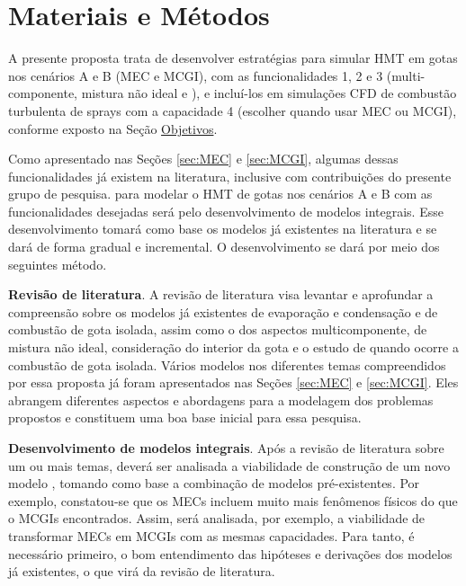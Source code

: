 

\section{Materiais e Métodos} \label{sec:metod}

A presente proposta trata de desenvolver estratégias para simular HMT em gotas nos cenários {A} e {B} (MEC e MCGI), com as funcionalidades {1}, {2} e {3} (multi-componente, mistura não ideal e ), e incluí-los em simulações CFD de combustão turbulenta de sprays com a capacidade 4 (escolher quando usar MEC ou MCGI), conforme exposto na Seção \hyperref[sec:objetivos]{Objetivos}.

Como apresentado nas Seções \ref{sec:MEC} e \ref{sec:MCGI}, algumas dessas funcionalidades já existem na literatura, inclusive com contribuições do presente grupo de pesquisa.
 para modelar o HMT de gotas nos cenários {A} e {B} com as funcionalidades desejadas será pelo desenvolvimento de modelos integrais.
Esse desenvolvimento tomará como base os modelos já existentes na literatura e se dará de forma gradual e incremental.
O desenvolvimento se dará por meio dos seguintes método.

\textbf{Revisão de literatura}. 
A revisão de literatura visa levantar e aprofundar a compreensão sobre os modelos já  existentes de evaporação e condensação e de combustão de gota isolada, assim como o dos aspectos multicomponente, de mistura não ideal, consideração do interior da gota e o estudo de quando ocorre a combustão de gota isolada.
Vários modelos nos diferentes temas compreendidos por essa proposta já foram apresentados nas Seções \ref{sec:MEC} e \ref{sec:MCGI}.
Eles abrangem diferentes aspectos e abordagens para a modelagem dos problemas propostos e constituem uma boa base inicial para essa pesquisa. 

\textbf{Desenvolvimento de modelos integrais}.
Após a revisão de literatura sobre um ou mais temas, deverá ser analisada a viabilidade de construção de um novo modelo , tomando como base a combinação de modelos  pré-existentes.
Por exemplo, constatou-se que os MECs incluem muito mais fenômenos físicos do que o MCGIs encontrados. 
Assim, será analisada, por exemplo, a viabilidade de transformar MECs em MCGIs com as mesmas capacidades.
Para tanto, é necessário primeiro, o bom entendimento das hipóteses e derivações dos modelos já existentes, o que virá da revisão de literatura.   

